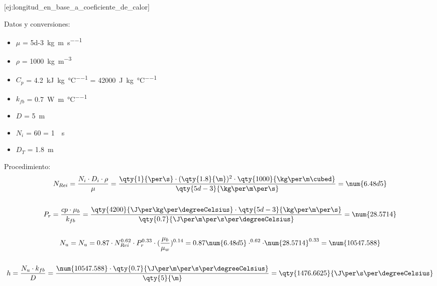 [ej:longitud_en_base_a_coeficiente_de_calor]{
    Datos y conversiones:
    \begin{itemize}
        \item $\mu$ = \qty{5d-3}{\kg\per\m\per\s}
        \item $\rho$ = \qty{1000}{\kg\per\m\cubed}
        \item $C_{p}$ = \qty{4.2}{\kilo\J\per\kg\per\degreeCelsius} = \qty{42000}{\J\per\kg\per\degreeCelsius}
        \item $k_{fb}$ = \qty{0.7}{\watt\per\m\per\degreeCelsius}
        \item $D$ = \qty{5}{\m}
        \item $N_{i}$ = \qty{60}{\rpm} = \qty{1}{\per\s}
        \item $D_{T}$ = \qty{1.8}{\m}
    \end{itemize}
    Procedimiento:
    \begin{gather*}
        N_{Rei} = \frac{N_{i} \cdot D_{i} \cdot \rho}{\mu} = \frac{\qty{1}{\per\s} \cdot (\qty{1.8}{\m})^{2} \cdot \qty{1000}{\kg\per\m\cubed}}{\qty{5d-3}{\kg\per\m\per\s}} = \num{6.48d5}
        \\\\
        P_{r} = \frac{cp \cdot \mu_{b}}{k_{fb}} = \frac{\qty{4200}{\J\per\kg\per\degreeCelsius} \cdot \qty{5d-3}{\kg\per\m\per\s}}{\qty{0.7}{\J\per\m\per\s\per\degreeCelsius}} = \num{28.5714}
        \\\\
        N_{u} = N_{u} = 0.87 \cdot N_{Rei}^{0.62} \cdot P_{r}^{0.33} \cdot (\frac{\mu_{b}}{\mu_{w}})^{0.14} = 0.87 \num{6.48d5}\cdot ^{0.62} \cdot \num{28.5714}^{0.33} = \num{10547.588}
        \\\\
        h = \frac{N_{u} \cdot k_{fb}}{D} = \frac{\num{10547.588 } \cdot\qty{0.7}{\J\per\m\per\s\per\degreeCelsius}}{\qty{5}{\m}} = \qty{1476.6625}{\J\per\s\per\degreeCelsius}
    \end{gather*}
}

